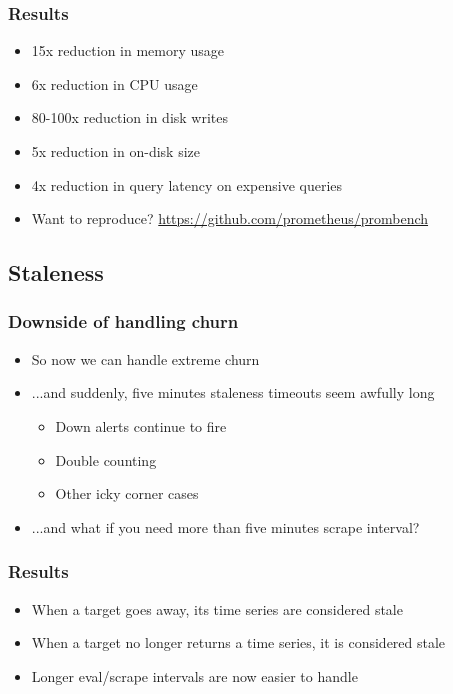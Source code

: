 \documentclass[t]{beamer}
\begin{document}
\begin{frame}
	\frametitle{Results}
	\begin{itemize}
		\item 15x reduction in memory usage
		\item 6x reduction in CPU usage
		\item 80-100x reduction in disk writes
		\item 5x reduction in on-disk size
		\item 4x reduction in query latency on expensive queries
		\item Want to reproduce? \url{https://github.com/prometheus/prombench}
	\end{itemize}
\end{frame}



\subsection{Staleness}


\begin{frame}
	\frametitle{Downside of handling churn}
	\begin{itemize}
		\item So now we can handle extreme churn
		\item ...and suddenly, five minutes staleness timeouts seem awfully long
		\begin{itemize}
			\item Down alerts continue to fire
			\item Double counting
			\item Other icky corner cases
		\end{itemize}
		\item ...and what if you need more than five minutes scrape interval?
	\end{itemize}
\end{frame}

\begin{frame}
	\frametitle{Results}
	\begin{itemize}
		\item When a target goes away, its time series are considered stale
		\item When a target no longer returns a time series, it is considered stale
		\item Longer eval/scrape intervals are now easier to handle
	\end{itemize}
\end{frame}
\end{document}
